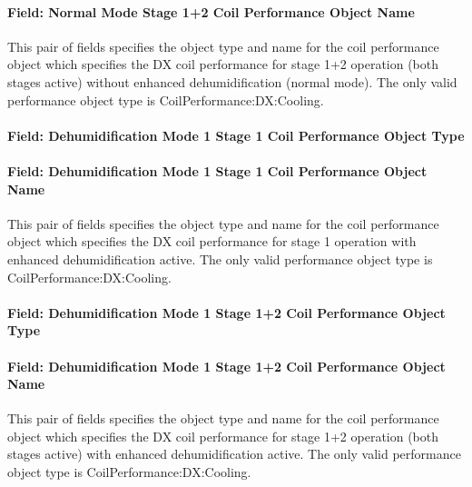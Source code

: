 \paragraph{Field: Normal Mode Stage 1+2 Coil Performance Object Name}\label{field-normal-mode-stage-12-coil-performance-object-name}

This pair of fields specifies the object type and name for the coil performance object which specifies the DX coil performance for stage 1+2 operation (both stages active) without enhanced dehumidification (normal mode). The only valid performance object type is CoilPerformance:DX:Cooling.

\paragraph{Field: Dehumidification Mode 1 Stage 1 Coil Performance Object Type}\label{field-dehumidification-mode-1-stage-1-coil-performance-object-type}

\paragraph{Field: Dehumidification Mode 1 Stage 1 Coil Performance Object Name}\label{field-dehumidification-mode-1-stage-1-coil-performance-object-name}

This pair of fields specifies the object type and name for the coil performance object which specifies the DX coil performance for stage 1 operation with enhanced dehumidification active. The only valid performance object type is CoilPerformance:DX:Cooling.

\paragraph{Field: Dehumidification Mode 1 Stage 1+2 Coil Performance Object Type}\label{field-dehumidification-mode-1-stage-12-coil-performance-object-type}

\paragraph{Field: Dehumidification Mode 1 Stage 1+2 Coil Performance Object Name}\label{field-dehumidification-mode-1-stage-12-coil-performance-object-name}

This pair of fields specifies the object type and name for the coil performance object which specifies the DX coil performance for stage 1+2 operation (both stages active) with enhanced dehumidification active. The only valid performance object type is CoilPerformance:DX:Cooling.

